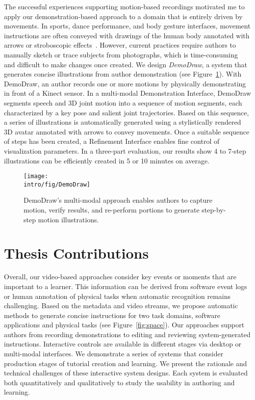 The successful experiences supporting motion-based recordings motivated me to apply our demonstration-based approach to a domain that is entirely driven by movements. In sports, dance performance, and body gesture interfaces, movement instructions are often conveyed with drawings of the human body annotated with arrows or stroboscopic effects~\cite{cutting_representing_2002}. However, current practices require authors to manually sketch or trace subjects from photographs, which is time-consuming and difficult to make changes once created.
%
We design \emph{DemoDraw}, a system that generates concise illustrations from author demonstration (see Figure~\ref{fig:demodraw_intro}). With DemoDraw, an author records one or more motions by physically demonstrating in front of a Kinect sensor. In a multi-modal Demonstration Interface, DemoDraw segments speech and 3D joint motion into a sequence of motion segments, each characterized by a key pose and salient joint trajectories. Based on this sequence, a series of illustrations is automatically generated using a stylistically rendered 3D avatar annotated with arrows to convey movements. Once a suitable sequence of steps has been created, a Refinement Interface enables fine control of visualization parameters.
%
In a three-part evaluation, our results show 4 to 7-step illustrations can be efficiently created in 5 or 10 minutes on average.

\begin{figure}[t]
  \centering
  \texttt{[image: \\intro/fig/DemoDraw]}
  \caption{DemoDraw's multi-modal approach enables authors to capture motion, verify results, and re-perform portions to generate step-by-step motion illustrations.}
  \label{fig:demodraw_intro}
\end{figure}


\section{Thesis Contributions}

Overall, our video-based approaches consider key events or moments that are important to a learner. This information can be derived from software event logs or human annotation of physical tasks when automatic recognition remains challenging. Based on the metadata and video streams, we propose automatic methods to generate concise instructions for two task domains, software applications and physical tasks (see Figure~\ref{fig:space}). Our approaches support authors from recording demonstrations to editing and reviewing system-generated instructions. Interactive controls are available in different stages via desktop or multi-modal interfaces.
%
We demonstrate a series of systems that consider production stages of tutorial creation and learning. We present the rationale and technical challenges of these interactive system designs. Each system is evaluated both quantitatively and qualitatively to study the usability in authoring and learning.

